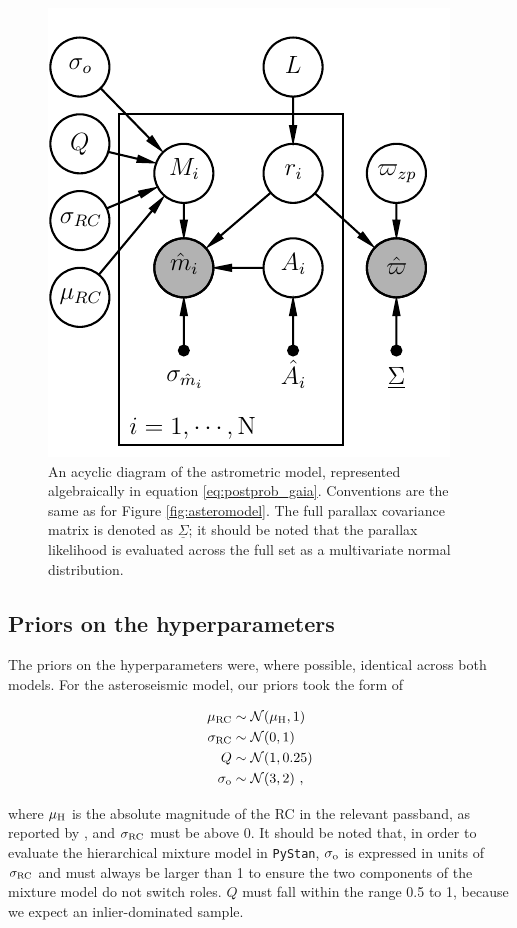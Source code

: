 \documentclass[fleqn,usenatbib]{mnras}
\begin{document}
\begin{figure}
\centering
\includegraphics[width=.48\textwidth]{gaiastan_alt.pdf}
\caption{An acyclic diagram of the astrometric model, represented algebraically in equation \ref{eq:postprob_gaia}. Conventions are the same as for Figure \ref{fig:asteromodel}. The full parallax covariance matrix is denoted as $\underline{\Sigma}$; it should be noted that the parallax likelihood is evaluated across the full set as a multivariate normal distribution.}
\label{fig:gaiamodel}
\end{figure}

\subsection{Priors on the hyperparameters}
The priors on the hyperparameters were, where possible, identical across both models. For the asteroseismic model, our priors took the form of

\begin{equation}\label{eq:asteropriors}
\begin{split}
\mu_{\rm RC} &\sim \mathcal{N}(\mu_{\rm H}, 1)\\
\sigma_{\rm RC} &\sim \mathcal{N}(0, 1)\\
Q &\sim\mathcal{N}(1, 0.25)\\
\sigma_{\rm o} &\sim \mathcal{N}(3, 2)\ , \\
\end{split}
\end{equation}

\noindent where $\mu_{\rm H}$ is the absolute magnitude of the RC in the relevant passband, as reported by , and $\sigma_{\rm RC}$ must be above 0. It should be noted that, in order to evaluate the hierarchical mixture model in \texttt{PyStan}, $\sigma_{\rm o}$ is expressed in units of $\sigma_{\rm RC}$ and must always be larger than 1 to ensure the two components of the mixture model do not switch roles. $Q$ must fall within the range 0.5 to 1, because we expect an inlier-dominated sample.
\end{document}
